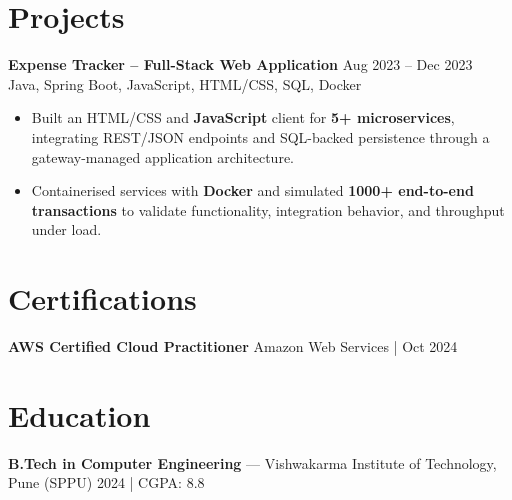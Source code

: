 \documentclass[10pt,letterpaper]{article}
\newcommand{\resumeSubheading}[4]{%
  \textbf{#1} \hfill #2 \\
  #3 \hfill #4 \\
}
\begin{document}
\section*{Projects}
\resumeSubheading{Expense Tracker -- Full-Stack Web Application}{Aug 2023 -- Dec 2023}{}{Java, Spring Boot, JavaScript, HTML/CSS, SQL, Docker}
\begin{itemize}
    \item Built an HTML/CSS and \textbf{JavaScript} client for \textbf{5+ microservices}, integrating REST/JSON endpoints and SQL-backed persistence through a gateway-managed application architecture.
    \item Containerised services with \textbf{Docker} and simulated \textbf{1000+ end-to-end transactions} to validate functionality, integration behavior, and throughput under load.
\end{itemize}

\section*{Certifications}
\textbf{AWS Certified Cloud Practitioner} \hfill Amazon Web Services \;|\; Oct 2024

\section*{Education}
\textbf{B.Tech in Computer Engineering} --- Vishwakarma Institute of Technology, Pune (SPPU) \hfill 2024 \;|\; CGPA: 8.8
\end{document}
